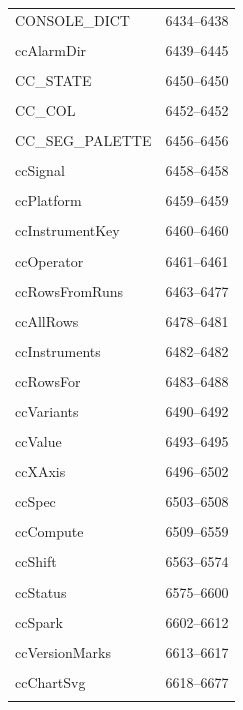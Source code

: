 {\begin{longtable}{@{}p{11cm}r@{}}
CONSOLE\_DICT & 6434--6438 \\\\\hline
ccAlarmDir & 6439--6445 \\\\\hline
CC\_STATE & 6450--6450 \\\\\hline
CC\_COL & 6452--6452 \\\\\hline
CC\_SEG\_PALETTE & 6456--6456 \\\\\hline
ccSignal & 6458--6458 \\\\\hline
ccPlatform & 6459--6459 \\\\\hline
ccInstrumentKey & 6460--6460 \\\\\hline
ccOperator & 6461--6461 \\\\\hline
ccRowsFromRuns & 6463--6477 \\\\\hline
ccAllRows & 6478--6481 \\\\\hline
ccInstruments & 6482--6482 \\\\\hline
ccRowsFor & 6483--6488 \\\\\hline
ccVariants & 6490--6492 \\\\\hline
ccValue & 6493--6495 \\\\\hline
ccXAxis & 6496--6502 \\\\\hline
ccSpec & 6503--6508 \\\\\hline
ccCompute & 6509--6559 \\\\\hline
ccShift & 6563--6574 \\\\\hline
ccStatus & 6575--6600 \\\\\hline
ccSpark & 6602--6612 \\\\\hline
ccVersionMarks & 6613--6617 \\\\\hline
ccChartSvg & 6618--6677 \\\\\hline

\end{longtable}}
